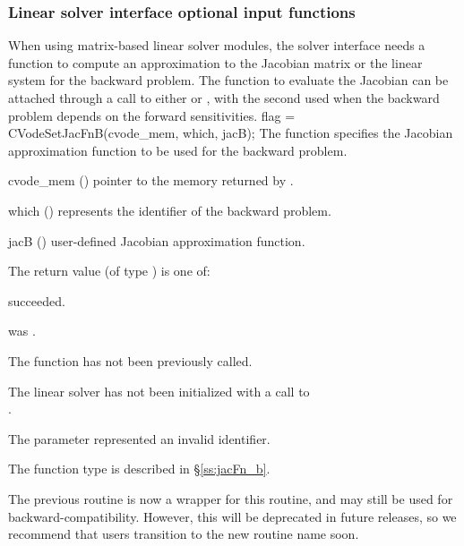 \subsubsection{Linear solver interface optional input functions}
When using matrix-based linear solver modules, the {\cvls} solver interface
needs a function to compute an approximation to the Jacobian matrix or the
linear system for the backward problem. The function to evaluate the Jacobian
can be attached through a call to either  or
, with the second used when the backward problem depends
on the forward sensitivities.
{
  flag = CVodeSetJacFnB(cvode\_mem, which, jacB);
}
{
  The function  specifies the Jacobian
  approximation function to be used for the backward problem.
}
{
  \begin{args}
  \item[cvode\_mem] ()
    pointer to the {\cvodes} memory returned by .
  \item[which] ()
    represents the identifier of the backward problem.
  \item[jacB] ()
    user-defined Jacobian approximation function.
  \end{args}
}
{
  The return value  (of type ) is one of:
  \begin{args}
  \item[\Id{CVLS\_SUCCESS}]
     succeeded.
  \item[\Id{CVLS\_MEM\_NULL}]
     was .
  \item[\Id{CVLS\_NO\_ADJ}]
    The function  has not been previously called.
  \item[\Id{CVLS\_LMEM\_NULL}]
    The linear solver has not been initialized with a call to \\ \noindent
    .
  \item[\Id{CVLS\_ILL\_INPUT}]
    The parameter  represented an invalid identifier.
  \end{args}
}
{
  The function type  is described in \S\ref{ss:jacFn_b}.

  The previous routine  is now a wrapper for this
  routine, and may still be used for backward-compatibility.  However,
  this will be deprecated in future releases, so we recommend that
  users transition to the new routine name soon.
}
